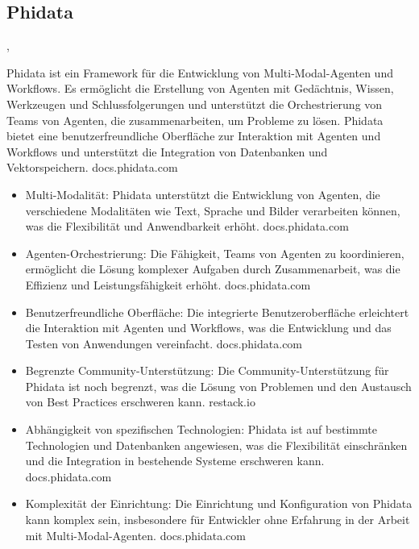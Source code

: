 \subsection{Phidata}\cite{phidata_introduction},\cite{phidata_vs_langchain_comparison}

Phidata ist ein Framework für die Entwicklung von Multi-Modal-Agenten und Workflows. Es ermöglicht die Erstellung von Agenten mit Gedächtnis, Wissen, Werkzeugen und Schlussfolgerungen und unterstützt die Orchestrierung von Teams von Agenten, die zusammenarbeiten, um Probleme zu lösen. Phidata bietet eine benutzerfreundliche Oberfläche zur Interaktion mit Agenten und Workflows und unterstützt die Integration von Datenbanken und Vektorspeichern.
docs.phidata.com

\begin{itemize}
    \item Multi-Modalität: Phidata unterstützt die Entwicklung von Agenten, die verschiedene Modalitäten wie Text, Sprache und Bilder verarbeiten können, was die Flexibilität und Anwendbarkeit erhöht.
    docs.phidata.com

    \item Agenten-Orchestrierung: Die Fähigkeit, Teams von Agenten zu koordinieren, ermöglicht die Lösung komplexer Aufgaben durch Zusammenarbeit, was die Effizienz und Leistungsfähigkeit erhöht.
    docs.phidata.com

    \item Benutzerfreundliche Oberfläche: Die integrierte Benutzeroberfläche erleichtert die Interaktion mit Agenten und Workflows, was die Entwicklung und das Testen von Anwendungen vereinfacht.
    docs.phidata.com
\end{itemize}

\begin{itemize}
    \item Begrenzte Community-Unterstützung: Die Community-Unterstützung für Phidata ist noch begrenzt, was die Lösung von Problemen und den Austausch von Best Practices erschweren kann.
    restack.io

    \item Abhängigkeit von spezifischen Technologien: Phidata ist auf bestimmte Technologien und Datenbanken angewiesen, was die Flexibilität einschränken und die Integration in bestehende Systeme erschweren kann.
    docs.phidata.com

    \item Komplexität der Einrichtung: Die Einrichtung und Konfiguration von Phidata kann komplex sein, insbesondere für Entwickler ohne Erfahrung in der Arbeit mit Multi-Modal-Agenten.
    docs.phidata.com
\end{itemize}

